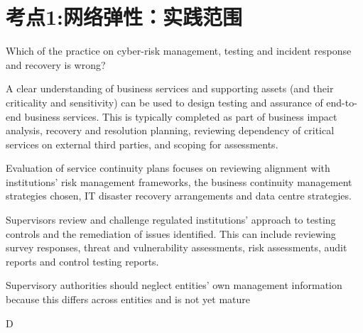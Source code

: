 \documentclass{article}
\newcounter{question} %
\begin{document}
 \tableofcontents %
\newpage




\section{考点1:网络弹性：实践范围}
\setcounter{question}{0}

\begin{question}
    Which of the practice on cyber-risk management, testing and incident response and recovery is wrong?
\end{question}

\begin{choices}
    \item A clear understanding of business services and supporting assets (and their criticality and sensitivity) can be used to design testing and assurance of end-to-end business services. This is typically completed as part of business impact analysis, recovery and resolution planning, reviewing dependency of critical services on external third parties, and scoping for assessments.
    \item Evaluation of service continuity plans focuses on reviewing alignment with institutions' risk management frameworks, the business continuity management strategies chosen, IT disaster recovery arrangements and data centre strategies.
    \item Supervisors review and challenge regulated institutions' approach to testing controls and the remediation of issues identified. This can include reviewing survey responses, threat and vulnerability assessments, risk assessments, audit reports and control testing reports.
    \item Supervisory authorities should neglect entities’ own management information because this differs across entities and is not yet mature
\end{choices}

\begin{correctanswer}
    D
\end{correctanswer}
\end{document}
